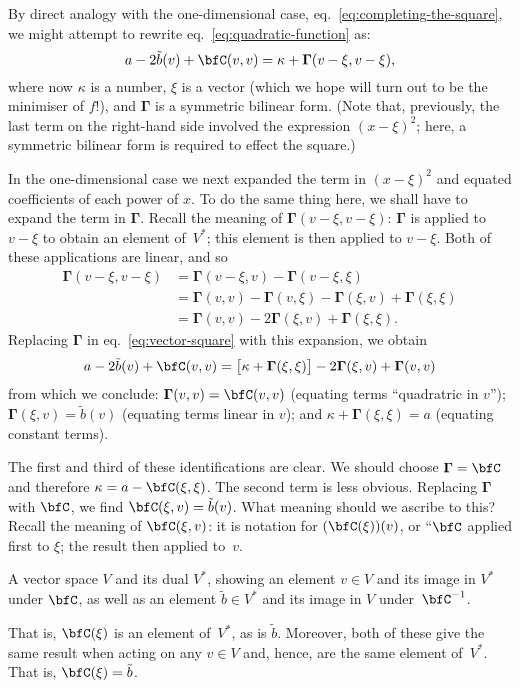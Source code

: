 \documentclass[10pt, a4paper]{article}
\begin{document}
By direct analogy with the one-dimensional case,
eq.~\eqref{eq:completing-the-square}, we might attempt to rewrite
eq.~\eqref{eq:quadratic-function} as:
\begin{equation}
  a - 2\tilde{b}(v) + \bfC(v, v) = \kappa + \bm{\Gamma}(v - \xi, v - \xi),
  \label{eq:vector-square}
\end{equation}
where now $\kappa$ is a number, $\xi$ is a vector (which we hope will turn
out to be the minimiser of $f$!), and $\bm{\Gamma}$ is a symmetric bilinear
form. (Note that, previously, the last term on the right-hand side
involved the expression ${(x-\xi)}^2$; here, a symmetric bilinear form
is required to effect the square.)

In the one-dimensional case we next expanded the term in ${(x-\xi)}^2$
and equated coefficients of each power of $x$. To do the same thing
here, we shall have to expand the term in $\bm{\Gamma}$. Recall the meaning of
$\bm{\Gamma}(v-\xi, v-\xi)$: $\bm{\Gamma}$ is applied to $v-\xi$ to obtain an element
of~$V^*$; this element is then applied to $v-\xi$. Both of these
applications are linear, and so
\[
  \begin{aligned}
  \bm{\Gamma}(v-\xi,v-\xi) & = \bm{\Gamma}(v-\xi,v)-\bm{\Gamma}(v-\xi, \xi) \\
  & = \bm{\Gamma}(v,v)-\bm{\Gamma}(v, \xi) - \bm{\Gamma}(\xi,v) + \bm{\Gamma}(\xi, \xi) \\
  & = \bm{\Gamma}(v,v)-2\bm{\Gamma}(\xi,v)+\bm{\Gamma}(\xi,\xi).
  \end{aligned}
\]
Replacing $\bm{\Gamma}$ in eq.~\eqref{eq:vector-square} with this expansion, we
obtain
\[
  a -2\tilde{b}(v)+\bfC(v,v) = \bigl[\kappa+\bm{\Gamma}(\xi,\xi)\bigr] -2\bm{\Gamma}(\xi,v) + \bm{\Gamma}(v,v)
\]
from which we conclude: $\bm{\Gamma}(v,v) = \bfC(v,v)$ (equating terms
“quadratric in $v$”); $\bm{\Gamma}(\xi, v) = \tilde{b}(v)$ (equating terms
linear in $v$); and $\kappa+\bm{\Gamma}(\xi,\xi)=a$ (equating constant terms).

The first and third of these identifications are clear. We should
choose $\bm{\Gamma}=\bfC$ and therefore $\kappa=a-\bfC(\xi,\xi)$. The second term is
less obvious. Replacing $\bm{\Gamma}$ with $\bfC$, we find
$\bfC(\xi, v) = \tilde{b}(v)$. What meaning should we ascribe to this?
Recall the meaning of $\bfC(\xi,v)$: it is notation for
$(\bfC(\xi))(v)$, or “$\bfC$ applied first to $\xi$; the result then
applied to~$v$.
\begin{marginfigure}
  \begin{center}
  \end{center}
\caption{A vector space $V$ and its dual $V^*$, showing an element $v\in
  V$ and its image in $V^*$ under $\bfC$, as well as an element
  $\tilde{b}\in V^*$ and its image in $V$ under~$\bfC^{-1}$.\label{fig:bilinear-form2}}
\end{marginfigure}
That is, $\bfC(\xi)$ is an element of~$V^*$, as is $\tilde{b}$. Moreover,
both of these give the same result when acting on any $v\in V$ and,
hence, are the same element of~$V^*$. That is, $\bfC(\xi) = \tilde{b}$. 
\end{document}
